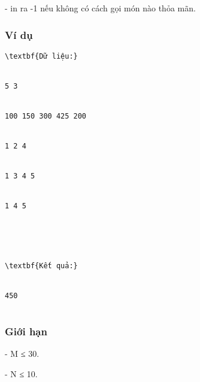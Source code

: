    - in ra -1 nếu không có cách gọi món nào thỏa mãn.  

\subsubsection{   Ví dụ  }
\begin{verbatim}
\textbf{Dữ liệu:}


5 3


100 150 300 425 200


1 2 4


1 3 4 5


1 4 5





\textbf{Kết quả:}


450


\end{verbatim}

\subsubsection{   Giới hạn  }

   - M ≤ 30.   


   - N ≤ 10.  

